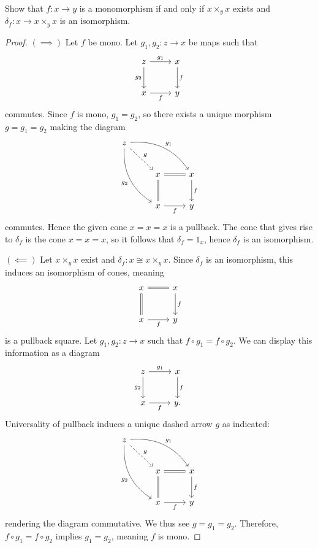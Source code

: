 \begin{exercise}
	Show that $f : x \to y$ is a monomorphism if and only if $x\times _yx$ exists and $\delta _f : x \to x\times _yx$ is an isomorphism.
\end{exercise}
\begin{proof}
	$(\implies )$ Let $f$ be mono. Let $g_1,g_2 : z \to x$ be maps such that
	\[\begin{tikzcd}[row sep =  2.5em, column sep = 2.5em]
	z\ar[" g_1 ", r] \ar[" g_2 "', d]  & x\ar[" f ", d]  \\
	x \ar[" f "', r]  & y
	\end{tikzcd}\]
	commutes. Since $f$ is mono, $g_1=g_2$, so there exists a unique morphism $g = g_1 = g_2$ making the diagram
	\[\begin{tikzcd}[row sep = 2.5em, column sep = 2.5em]
	z \ar[" g_1 ", bend left, drr] \ar[" g_2 "', bend right, ddr] \ar[" g ", dashed, dr]  &  &  \\
	 & x \ar[equals, r] \ar[equals, d]  & x \ar[" f ", d]  \\
	 & x \ar[" f "', r]  & y
	\end{tikzcd}\]
	commutes. Hence the given cone $x = x = x$ is a pullback. The cone that gives rise to $\delta _f$ is the cone $x=x=x$, so it follows that $\delta _f = 1_x$, hence $\delta _f$ is an isomorphism.

	$(\impliedby )$ Let $x\times _yx$ exist and $\delta _f : x \cong x\times _yx$. Since $\delta _f$ is an isomorphism, this induces an isomorphism of cones, meaning
	\[\begin{tikzcd}[row sep = 2.5em, column sep = 2.5em]
	x\ar[equals, r] \ar[equals, d]  & x\ar[" f ", d]  \\
	x \ar[" f "', r]  & y
	\end{tikzcd}\]
	is a pullback square. Let $g_1,g_2 : z \to x$ such that $f\circ g_1=f\circ g_2$. We can display this information as a diagram
	\[\begin{tikzcd}[row sep = 2.5em, column sep = 2.5em]
	z \ar[" g_1 ", r] \ar[" g_2 "', d]  & x \ar[" f ", d]  \\
	x \ar[" f "', r]  & y.
	\end{tikzcd}\]
	Universality of pullback induces a unique dashed arrow $g$ as indicated:
	\[\begin{tikzcd}[row sep = 2.5em, column sep = 2.5em]
	z \ar[" g_1 ", bend left, drr] \ar[" g_2 "', bend right, ddr] \ar[" g ", dashed, dr]  &  &  \\
	 & x\ar[equals, r] \ar[equals, d]  & x\ar[" f ", d]  \\
	 & x \ar[" f "', r]  & y
	\end{tikzcd}\]
	rendering the diagram commutative. We thus see $g=g_1=g_2$. Therefore, $f\circ g_1=f\circ g_2$ implies $g_1=g_2$, meaning $f$ is mono.
\end{proof}

